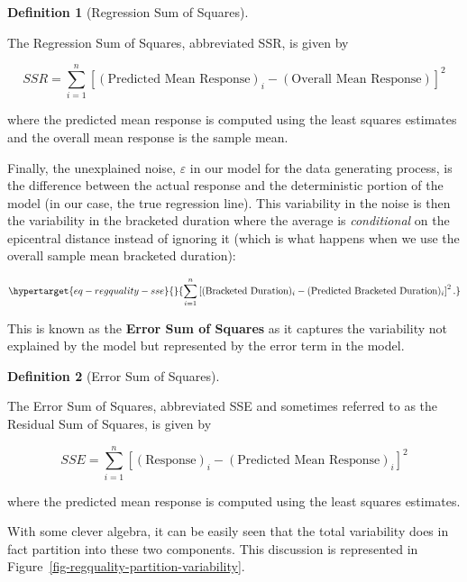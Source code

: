 \documentclass[
  letterpaper,
  DIV=11,
  numbers=noendperiod]{scrreprt}
\theoremstyle{definition}
\newtheorem{definition}{Definition}[chapter]
\theoremstyle{definition}
\theoremstyle{plain}
\theoremstyle{remark}
\begin{document}
\begin{definition}[Regression Sum of
Squares]\protect\hypertarget{def-ssr}{}\label{def-ssr}

The Regression Sum of Squares, abbreviated SSR, is given by

\[SSR = \sum_{i=1}^{n} \left[(\text{Predicted Mean Response})_i - (\text{Overall Mean Response})\right]^2\]

where the predicted mean response is computed using the least squares
estimates and the overall mean response is the sample mean.

\end{definition}

Finally, the unexplained noise, \(\varepsilon\) in our model for the
data generating process, is the difference between the actual response
and the deterministic portion of the model (in our case, the true
regression line). This variability in the noise is then the variability
in the bracketed duration where the average is \emph{conditional} on the
epicentral distance instead of ignoring it (which is what happens when
we use the overall sample mean bracketed duration):

\begin{equation}\protect\hypertarget{eq-regquality-sse}{}{\sum_{i=1}^{n} \left[(\text{Bracketed Duration})_i - (\text{Predicted Bracketed Duration})_i\right]^2.}\label{eq-regquality-sse}\end{equation}

This is known as the \textbf{Error Sum of Squares} as it captures the
variability not explained by the model but represented by the error term
in the model.

\begin{definition}[Error Sum of
Squares]\protect\hypertarget{def-sse}{}\label{def-sse}

The Error Sum of Squares, abbreviated SSE and sometimes referred to as
the Residual Sum of Squares, is given by

\[SSE = \sum_{i=1}^{n} \left[(\text{Response})_i - (\text{Predicted Mean Response})_i\right]^2\]

where the predicted mean response is computed using the least squares
estimates.

\end{definition}

With some clever algebra, it can be easily seen that the total
variability does in fact partition into these two components. This
discussion is represented in
Figure~\ref{fig-regquality-partition-variability}.
\end{document}
